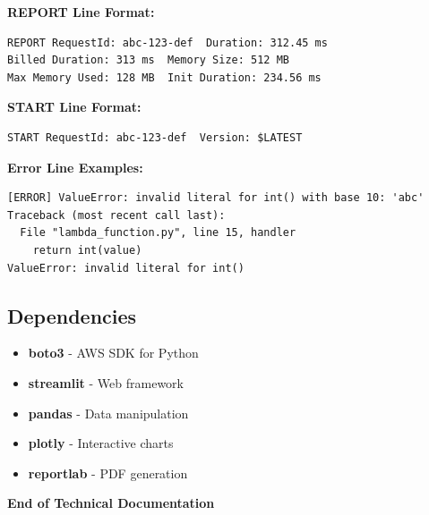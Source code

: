 \documentclass[12pt,a4paper]{article}
\begin{document}
\bigskip
\noindent\textbf{REPORT Line Format:}
\begin{verbatim}
REPORT RequestId: abc-123-def  Duration: 312.45 ms  
Billed Duration: 313 ms  Memory Size: 512 MB  
Max Memory Used: 128 MB  Init Duration: 234.56 ms
\end{verbatim}

\bigskip
\noindent\textbf{START Line Format:}
\begin{verbatim}
START RequestId: abc-123-def  Version: $LATEST
\end{verbatim}

\bigskip
\noindent\textbf{Error Line Examples:}
\begin{verbatim}
[ERROR] ValueError: invalid literal for int() with base 10: 'abc'
Traceback (most recent call last):
  File "lambda_function.py", line 15, handler
    return int(value)
ValueError: invalid literal for int()
\end{verbatim}

\subsection{Dependencies}
\begin{itemize}
    \item \textbf{boto3} - AWS SDK for Python
    \item \textbf{streamlit} - Web framework
    \item \textbf{pandas} - Data manipulation
    \item \textbf{plotly} - Interactive charts
    \item \textbf{reportlab} - PDF generation
\end{itemize}

\vfill
\begin{center}
\textbf{End of Technical Documentation}
\end{center}
\end{document}

